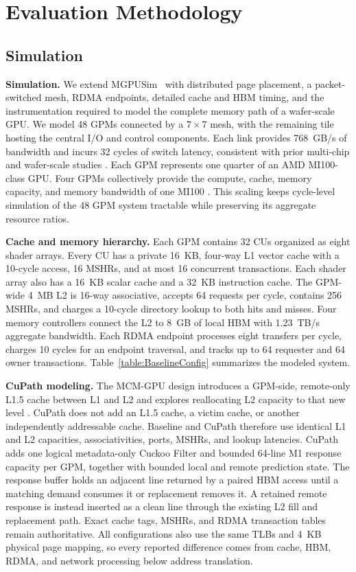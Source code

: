 \section{Evaluation Methodology}
\label{sec:evaluation}

\subsection{Simulation}

\textbf{Simulation.}
We extend MGPUSim~\cite{sun2019mgpusim} with distributed page placement, a
packet-switched mesh, RDMA endpoints, detailed cache and HBM timing, and the
instrumentation required to model the complete memory path of a wafer-scale
GPU.  We model 48 GPMs connected by a $7\times7$ mesh, with the remaining tile
hosting the central I/O and control components.  Each link provides 768~GB/s
of bandwidth and incurs 32 cycles of switch latency, consistent with prior
multi-chip and wafer-scale studies
\cite{arunkumar2017mcm,feng2024barre}.  Each GPM represents one quarter of an
AMD MI100-class GPU.  Four GPMs collectively provide the compute, cache,
memory capacity, and memory bandwidth of one MI100
\cite{techpowerup_mi100}.  This scaling keeps cycle-level simulation of the
48 GPM system tractable while preserving its aggregate resource ratios.

\textbf{Cache and memory hierarchy.}
Each GPM contains 32 CUs organized as eight shader arrays.  Every CU has a
private 16~KB, four-way L1 vector cache with a 10-cycle access, 16 MSHRs, and
at most 16 concurrent transactions.  Each shader array also has a 16~KB
scalar cache and a 32~KB instruction cache.  The GPM-wide 4~MB L2 is 16-way
associative, accepts 64 requests per cycle, contains 256 MSHRs, and charges a
10-cycle directory lookup to both
hits and misses.  Four memory controllers connect the L2 to 8~GB of local HBM
with 1.23~TB/s aggregate bandwidth.  Each RDMA endpoint processes eight
transfers per cycle, charges 10 cycles for an endpoint traversal, and tracks
up to 64 requester and 64 owner transactions.  Table~\ref{table:BaselineConfig}
summarizes the modeled system.

\textbf{CuPath modeling.}
The MCM-GPU design introduces a GPM-side, remote-only L1.5 cache between L1
and L2 and explores reallocating L2 capacity to that new level
\cite{arunkumar2017mcm}.  CuPath does not add an L1.5 cache, a victim cache,
or another independently addressable cache.  Baseline and CuPath therefore
use identical L1 and L2 capacities, associativities, ports, MSHRs, and lookup
latencies.  CuPath adds one logical metadata-only Cuckoo Filter and bounded
64-line M1 response capacity per GPM, together with bounded local and remote
prediction state.  The response buffer holds an adjacent line returned by a
paired HBM access until a matching demand consumes it or replacement removes
it.  A retained remote response is instead inserted as a clean line through
the existing L2 fill and replacement path.  Exact cache tags, MSHRs, and RDMA
transaction tables remain authoritative.  All
configurations also use the same TLBs and 4~KB physical page mapping, so every
reported difference comes from cache, HBM, RDMA, and network processing below
address translation.


